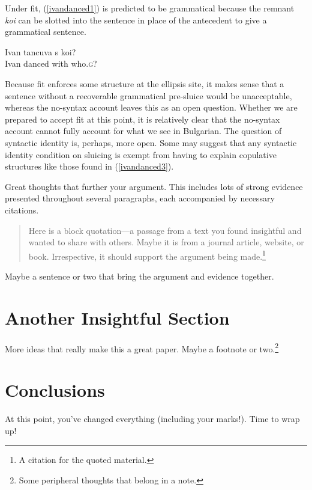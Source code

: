 \documentclass{turabian-researchpaper}
\begin{document}
Under fit, (\ref{ivandanced1}) is predicted to be grammatical because the remnant \textit{koi} can be slotted into the sentence in place of the antecedent to give a grammatical sentence. 

\begin{exe}
\ex\label{ivandanced6}
\gll Ivan tancuva s      koi? \\ 
 Ivan danced   with who.\textsc{g}? \\
 \end{exe}
 
Because fit enforces some structure at the ellipsis site, it makes sense that a sentence without a recoverable grammatical pre-sluice would be unacceptable, whereas the no-syntax account leaves this as an open question. Whether we are prepared to accept fit at this point, it is relatively clear that the no-syntax account cannot fully account for what we see in Bulgarian. The question of syntactic identity is, perhaps, more open. Some may suggest that any syntactic identity condition on sluicing is exempt from having to explain copulative structures like those found in (\ref{ivandanced3}).

Great thoughts that further your argument. This includes lots of strong evidence presented throughout several paragraphs, each accompanied by necessary citations.
\begin{quotation}
    \noindent Here is a block quotation---a passage from a text you found insightful and wanted to share with others. Maybe it is from a journal article, website, or book. Irrespective, it should support the argument being made.\footnote{A citation for the quoted material.}
\end{quotation}
Maybe a sentence or two that bring the argument and evidence together.\autocite[34]{example_source}



\section{Another Insightful Section}

More ideas that really make this a great paper. Maybe a footnote or two.\footnote{Some peripheral thoughts that belong in a note.}


\section{Conclusions}

At this point, you've changed everything (including your marks!). Time to wrap up!


\clearpage
\printbibliography
\end{document}
